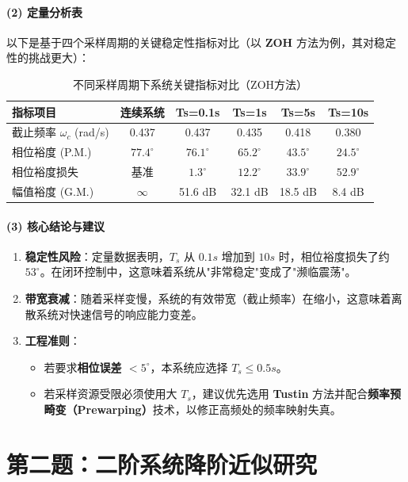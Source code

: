 \documentclass{article}
\begin{document}
\paragraph{(2) 定量分析表}
以下是基于四个采样周期的关键稳定性指标对比（以 \textbf{ZOH} 方法为例，其对稳定性的挑战更大）：
\begin{table}[h!]
\centering
\caption{不同采样周期下系统关键指标对比（ZOH方法）}
\begin{tabular}{@{}lccccc@{}}
\toprule
\textbf{指标项目} & \textbf{连续系统} & \textbf{Ts=0.1s} & \textbf{Ts=1s} & \textbf{Ts=5s} & \textbf{Ts=10s} \\ \midrule
截止频率 \( \omega_c \) (rad/s) & 0.437 & 0.437 & 0.435 & 0.418 & 0.380 \\
相位裕度 (P.M.) & \( 77.4^\circ \) & \( 76.1^\circ \) & \( 65.2^\circ \) & \( 43.5^\circ \) & \( 24.5^\circ \) \\
相位裕度损失 & 基准 & \( 1.3^\circ \) & \( 12.2^\circ \) & \( 33.9^\circ \) & \( 52.9^\circ \) \\
幅值裕度 (G.M.) & \( \infty \) & 51.6 dB & 32.1 dB & 18.5 dB & 8.4 dB \\ \bottomrule
\end{tabular}
\end{table}

\paragraph{(3) 核心结论与建议}
\begin{enumerate}
    \item \textbf{稳定性风险}：定量数据表明，\( T_s \) 从 \( 0.1s \) 增加到 \( 10s \) 时，相位裕度损失了约 \( 53^\circ \)。在闭环控制中，这意味着系统从"非常稳定"变成了"濒临震荡"。
    \item \textbf{带宽衰减}：随着采样变慢，系统的有效带宽（截止频率）在缩小，这意味着离散系统对快速信号的响应能力变差。
    \item \textbf{工程准则}：
    \begin{itemize}
        \item 若要求\textbf{相位误差 \( < 5^\circ \)}，本系统应选择 \( T_s \leq 0.5s \)。
        \item 若采样资源受限必须使用大 \( T_s \)，建议优先选用 \textbf{Tustin} 方法并配合\textbf{频率预畸变（Prewarping）}技术，以修正高频处的频率映射失真。
    \end{itemize}
\end{enumerate}

\newpage
\section*{第二题：二阶系统降阶近似研究}
\end{document}
